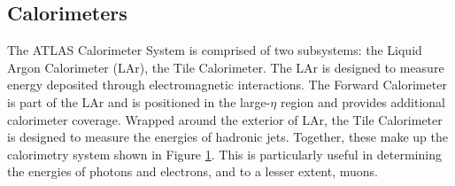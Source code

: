 \subsection{Calorimeters}

\begin{figure}[h!]
\captionsetup[subfigure]{position=b}
\centering
{}
\caption{}
\label{fig:atlasCalo}
\end{figure}

The ATLAS Calorimeter System is comprised of two subsystems: the Liquid Argon Calorimeter (LAr), the Tile Calorimeter.
The LAr is designed to measure energy deposited through electromagnetic interactions.
The Forward Calorimeter is part of the LAr and is positioned in the large-$\eta$ region and provides additional calorimeter coverage.
Wrapped around the exterior of LAr, the Tile Calorimeter is designed to measure the energies of hadronic jets.
Together, these make up the calorimetry system shown in Figure \ref{fig:atlasCalo}.
This is particularly useful in determining the energies of photons and electrons, and to a lesser extent, muons.

